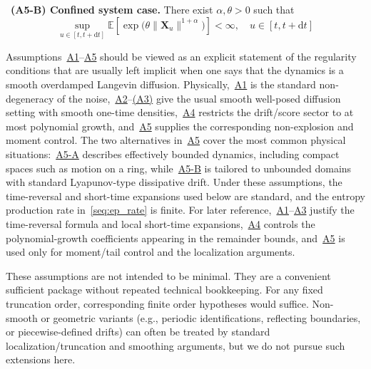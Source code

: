 \hypertarget{assumption:A5-B}{}
\noindent\textbullet\ \textbf{(A5-B) Confined system case.}
There exist $\alpha,\theta>0$ such that 
\begin{equation*}
    \sup_{u\in[t,t+\mathrm{d}t]}\mathbb{E}\!
    \left[\exp\!\big(\theta\|\bm X_u\|^{1+\alpha}\big)\right]<\infty,
    \quad u\in[t,t+\mathrm dt]
\end{equation*}

Assumptions~\hyperlink{assumption:A1}{A1}--\hyperlink{assumption:A5}{A5} should be viewed as an explicit statement of the regularity conditions that are usually left implicit when one says that the dynamics is a smooth overdamped Langevin diffusion. Physically,~\hyperlink{assumption:A1}{A1} is the standard non-degeneracy of the noise,~\hyperlink{assumption:A2}{A2}--\hyperlink{assumption:A3}{(A3)} give the usual smooth well-posed diffusion setting with smooth one-time densities,~\hyperlink{assumption:A4}{A4} restricts the drift/score sector to at most polynomial growth, and~\hyperlink{assumption:A5}{A5} supplies the corresponding non-explosion and moment control. The two alternatives in~\hyperlink{assumption:A5}{A5} cover the most common physical situations:~\hyperlink{assumption:A5-A}{A5-A} describes effectively bounded dynamics, including compact spaces such as motion on a ring, while~\hyperlink{assumption:A5-B}{A5-B} is tailored to unbounded domains with standard Lyapunov-type dissipative drift. Under these assumptions, the time-reversal and short-time expansions used below are standard, and the entropy production rate in~\eqref{seq:ep_rate} is finite.
For later reference,~\hyperlink{assumption:A1}{A1}--\hyperlink{assumption:A3}{A3} justify the time-reversal formula and local short-time expansions,~\hyperlink{assumption:A4}{A4} controls the polynomial-growth coefficients appearing in the remainder bounds, and~\hyperlink{assumption:A5}{A5} is used only for moment/tail control and the localization arguments.

These assumptions are not intended to be minimal. They are a convenient sufficient package without repeated technical bookkeeping. For any fixed truncation order, corresponding finite order hypotheses would suffice. Non-smooth or geometric variants (e.g., periodic identifications, reflecting boundaries, or piecewise-defined drifts) can often be treated by standard localization/truncation and smoothing arguments, but we do not pursue such extensions here.

